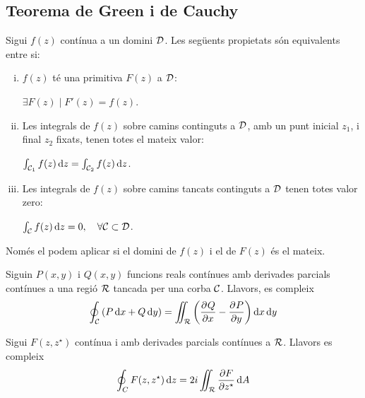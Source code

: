
\subsection{Teorema de Green i de Cauchy}
\begin{thm}
    Sigui $f(z)$ contínua a un domini $\mathcal{D}$. Les següents propietats són equivalents entre si:
    \begin{enumerate}[i)]
        \item $f(z)$ té una primitiva $F(z)$ a $\mathcal{D}$: 
        
        $\exists F(z) \mid F'(z) = f(z)$.
        \item Les integrals de $f(z)$ sobre camins continguts a $\mathcal{D}$, amb un punt inicial $z_{1}$, i final $z_{2}$ fixats, tenen totes el mateix valor: 
        
        $\int_{\mathcal{C}_{1}} f(z) \mathop{}\!\mathrm{d} z = \int_{\mathcal{C}_{2}} f(z) \mathop{}\!\mathrm{d} z$.
        \item Les integrals de $f(z)$ sobre camins tancats continguts a $\mathcal{D}$ tenen totes valor zero:
        
        $\int_{\mathcal{C}} f(z) \mathop{}\!\mathrm{d} z = 0, \quad \forall \mathcal{C} \subset \mathcal{D}$.
    \end{enumerate}
    Només el podem aplicar si el domini de $f(z)$ i el de $F(z)$ és el mateix.
\end{thm}

\begin{thm}
    Siguin $P(x,y)$ i $Q(x,y)$ funcions reals contínues amb derivades parcials contínues a una regió $\mathcal{R}$ tancada per una corba $\mathcal{C}$. Llavors, es compleix
    \begin{align}
        \oint_{\mathcal{C}} \left( P \mathop{}\!\mathrm{d} x + Q \mathop{}\!\mathrm{d} y \right) = \iint_{\mathcal{R}} \left( \frac{\partial^{}Q}{\partial x^{}} - \frac{\partial^{}P}{\partial y^{}} \right) \mathop{}\!\mathrm{d} x \mathop{}\!\mathrm{d} y
    \end{align}
\end{thm}

\begin{thm}
    Sigui $F(z,z^{\star})$ contínua i amb derivades parcials contínues a $\mathcal{R}$. Llavors es compleix
    \begin{align}
        \oint_{C} F(z, z^{\star}) \mathop{}\!\mathrm{d} z = 2i \iint_{\mathcal{R}} \frac{\partial F}{\partial z^{\star}} \mathop{}\!\mathrm{d} A
    \end{align}
\end{thm}


